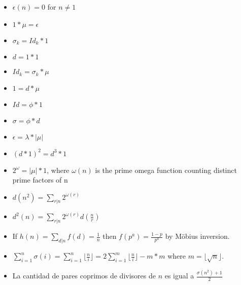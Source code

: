 {\normalsize
    \begin{itemize}
        \item $\epsilon(n) = 0$ for $n \neq 1$ 
        \item $1*\mu = \epsilon$
        \item $\sigma_k = Id_k*1$
        \item $d = 1 * 1$
        \item $Id_k = \sigma_k * \mu$
        \item $1 = d * \mu$
        \item $Id = \phi * 1$
        \item $\sigma = \phi * d$
        \item $\epsilon = \lambda*|\mu|$
        \item $(d*1)^2 = d^3*1$
        \item $2^\omega = |\mu|*1$, where ${\displaystyle \omega (n)}$ is the prime omega function counting distinct prime factors of n
        \item $\displaystyle d(n^2) = \sum_{r|n} 2^{\omega(r)}$ 
        \item $\displaystyle d^2(n) = \sum_{r|n} 2^{\omega(r)}d(\frac{n}{r})$ 
        \item If $h(n) = \sum_{d|n} f(d) = \frac{1}{n}$ then $f(p^a) = \frac{1-p}{p^a}$ by Möbius inversion.
        \item $\displaystyle \sum_{i=1}^{n} \sigma(i) = \sum_{i=1}^{n} \lfloor \frac{n}{i} \rfloor = 2\sum_{i=1}^{m} \lfloor \frac{n}{i} \rfloor - m*m$ where $m = \lfloor \sqrt{n} \rfloor$.
        \item La cantidad de pares coprimos de divisores de $n$ es igual a $\frac{\sigma(n^2)+1}{2}$
    \end{itemize} 
}
